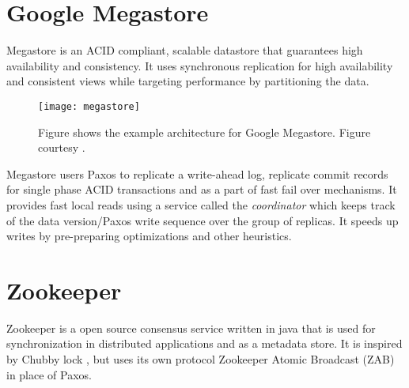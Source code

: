 \section{Google Megastore}

Megastore \citep{BakerBCFKLLLLY11} is an ACID%
compliant, scalable datastore that guarantees high availability and
consistency. It uses synchronous replication for high availability and
consistent views while targeting performance by partitioning the data.

\begin{figure}
  \texttt{[image: megastore]}
  \caption[Google Megastore]{%
    Figure shows the example architecture for Google Megastore.
    Figure courtesy \citet{BakerBCFKLLLLY11}.}
  \label{figure:megastore}
\end{figure}

Megastore users Paxos to replicate a write-ahead log, replicate commit
records for single phase ACID transactions and as a part of fast fail over
mechanisms. It provides fast local reads using a service called the
\emph{coordinator} which keeps track of the data version/Paxos write
sequence over the group of replicas. It speeds up writes by pre-preparing
optimizations and other heuristics.


\section{Zookeeper}
\label{section:zookeeper}

Zookeeper \citep{Hunt:2010:ZWC:1855840.1855851, zookeeper} is a open source 
consensus service written in java that is used for synchronization in 
distributed applications and as a metadata store. It is inspired by Chubby lock 
, but uses its own protocol Zookeeper Atomic Broadcast 
(ZAB) in place of Paxos.


